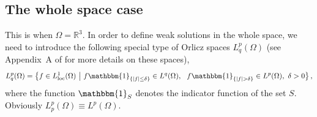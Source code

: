 \documentclass[11pt,reqno]{amsart}
\def \R{{\mathbb{R}}}
\begin{document}
  
\subsection{The whole space case}
\label{ss:rR3}
This is when  $\Omega=\R^3$. In order to define weak solutions in the whole space, we need to introduce the following special type of Orlicz spaces $L_q^p(\Omega)$ (see Appendix~A of \cite{Lio98} for more details on these spaces),
\begin{equation}
  \label{def_orlicz}
  L_q^p(\Omega) = \big\{
  f\in L_{\rm loc}^1(\Omega) \ \big | \ f\mathbbm{1}_{\{|f|\leq \delta\}} \in L^q(\Omega), \ \  f\mathbbm{1}_{\{|f|> \delta\}} \in L^p(\Omega), \ \delta >0
  \big\}\,,
\end{equation}
where the function $\mathbbm{1}_S$ denotes the indicator function of the set $S$. Obviously $L_p^p(\Omega)\equiv L^p(\Omega)$.
\end{document}
